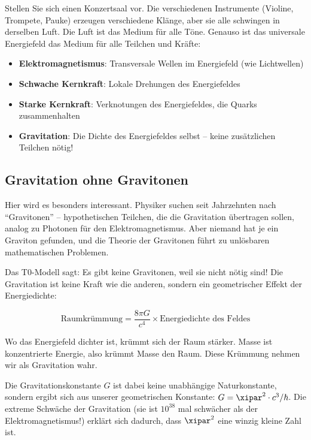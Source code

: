 	\begin{important}
		Stellen Sie sich einen Konzertsaal vor. Die verschiedenen Instrumente (Violine, Trompete, Pauke) erzeugen verschiedene Klänge, aber sie alle schwingen in derselben Luft. Die Luft ist das Medium für alle Töne. Genauso ist das universale Energiefeld das Medium für alle Teilchen und Kräfte:
		\begin{itemize}
			\item \textbf{Elektromagnetismus}: Transversale Wellen im Energiefeld (wie Lichtwellen)
			\item \textbf{Schwache Kernkraft}: Lokale Drehungen des Energiefeldes
			\item \textbf{Starke Kernkraft}: Verknotungen des Energiefeldes, die Quarks zusammenhalten
			\item \textbf{Gravitation}: Die Dichte des Energiefeldes selbst -- keine zusätzlichen Teilchen nötig!
		\end{itemize}
	\end{important}
	
	\subsection{Gravitation ohne Gravitonen}
	
	Hier wird es besonders interessant. Physiker suchen seit Jahrzehnten nach ``Gravitonen'' -- hypothetischen Teilchen, die die Gravitation übertragen sollen, analog zu Photonen für den Elektromagnetismus. Aber niemand hat je ein Graviton gefunden, und die Theorie der Gravitonen führt zu unlösbaren mathematischen Problemen.
	
	\begin{revolutionary}
		Das T0-Modell sagt: Es gibt keine Gravitonen, weil sie nicht nötig sind! Die Gravitation ist keine Kraft wie die anderen, sondern ein geometrischer Effekt der Energiedichte:
		
		\begin{equation}
			\text{Raumkrümmung} = \frac{8\pi G}{c^4} \times \text{Energiedichte des Feldes}
		\end{equation}
		
		Wo das Energiefeld dichter ist, krümmt sich der Raum stärker. Masse ist konzentrierte Energie, also krümmt Masse den Raum. Diese Krümmung nehmen wir als Gravitation wahr.
	\end{revolutionary}
	
	Die Gravitationskonstante $G$ ist dabei keine unabhängige Naturkonstante, sondern ergibt sich aus unserer geometrischen Konstante: $G = \xipar^2 \cdot c^3/\hbar$. Die extreme Schwäche der Gravitation (sie ist $10^{38}$ mal schwächer als der Elektromagnetismus!) erklärt sich dadurch, dass $\xipar^2$ eine winzig kleine Zahl ist.
	
